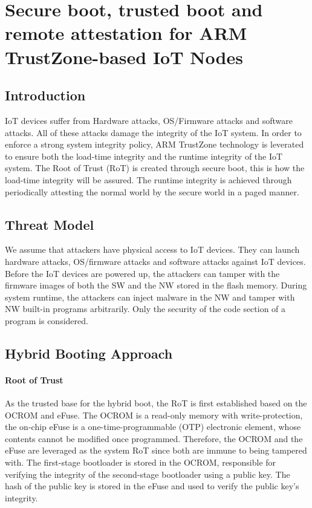 \documentclass{article}
\begin{document}
\section{Secure boot, trusted boot and remote attestation for ARM TrustZone-based IoT Nodes}

\subsection{Introduction}

IoT devices suffer from Hardware attacks, OS/Firmware attacks and software attacks. All of these attacks damage the integrity of the IoT system. In order to enforce a strong system integrity policy, ARM TrustZone technology is leverated to ensure both the load-time integrity and the runtime integrity of the IoT system. The Root of Trust (RoT) is created through secure boot, this is how the load-time integrity will be assured. The runtime integrity is achieved through periodically attesting the normal world by the secure world in a paged manner. 

\subsection{Threat Model}

We assume that attackers have physical access to IoT devices. They can launch hardware attacks, OS/firmware attacks and software attacks against IoT devices. Before the IoT devices are powered up, the attackers can tamper with the firmware images of both the SW and the NW stored in the flash memory. During system runtime, the attackers can inject malware in the NW and tamper with NW built-in programs arbitrarily. Only the security of the code section of a program is considered.

\subsection{Hybrid Booting Approach}

\paragraph{Root of Trust}

As the trusted base for the hybrid boot, the RoT is first established based on the OCROM and eFuse. The OCROM is a read-only memory with write-protection, the on-chip eFuse is a one-time-programmable (OTP) electronic element, whose contents cannot be modified once programmed. Therefore, the OCROM and the eFuse are leveraged as the system RoT since both are immune to being tampered with. The first-stage bootloader is stored in the OCROM, responsible for verifying the integrity of the second-stage bootloader using a public key. The hash of the public key is stored in the eFuse and used to verify the public key’s integrity.
\end{document}
